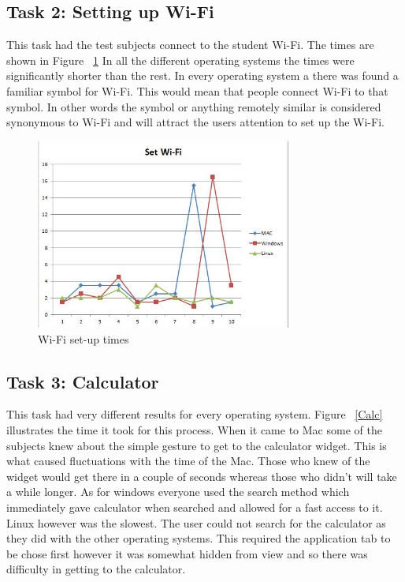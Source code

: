 \documentclass[11pt]{article}
\begin{document}
\subsection{Task 2: Setting up Wi-Fi}
This task had the test subjects connect to the student Wi-Fi. The times are shown in Figure ~\ref{Wi-Fi} In all the different operating systems the times were significantly shorter than the rest. In every operating system a there was found a familiar symbol for Wi-Fi. This would mean that people connect Wi-Fi to that symbol. In other words the symbol or anything remotely similar is considered synonymous to Wi-Fi and will attract the users attention to set up the Wi-Fi.

\begin{figure}[h!]
  \centering
    \includegraphics[width=0.75\textwidth]{./Images/Wi-Fi}
  \caption{Wi-Fi set-up times}
 \label{Wi-Fi}
\end{figure}


\subsection{Task 3: Calculator}
This task had very different results for every operating system. Figure ~\ref{Calc} illustrates the time it took for this process. When it came to Mac some of the subjects knew about the simple gesture to get to the calculator widget. This is what caused fluctuations with the time of the Mac. Those who knew of the widget would get there in a couple of seconds whereas those who didn’t will take a while longer. As for windows everyone used the search method which immediately gave calculator when searched and allowed for a fast access to it. Linux however was the slowest. The user could not search for the calculator as they did with the other operating systems. This required the application tab to be chose first however it was somewhat hidden from view and so there was difficulty in getting to the calculator.
\end{document}
